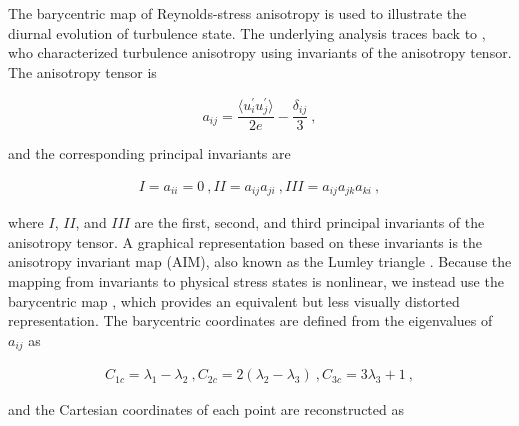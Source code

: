 \documentclass[draft]{agujournal2019}
\let\cite\shortcite
\begin{document}
\section{}
\label{sec:Anisotropy}
The barycentric map of Reynolds-stress anisotropy is used to illustrate the diurnal evolution of turbulence state. The underlying analysis traces back to , who characterized turbulence anisotropy using invariants of the anisotropy tensor. The anisotropy tensor is
\begin{linenomath*}
\begin{equation}
a_{ij}=\frac{\langle u_i^\prime u_j^\prime\rangle}{2e}-\frac{\delta_{ij}}{3}\ ,
\label{eq:Elements}
\end{equation}
\end{linenomath*}
and the corresponding principal invariants are
\begin{linenomath*}
\begin{subequations}
\begin{align}
I=a_{ii}=0 \ ,
II= a_{ij}a_{ji} \ ,
III=a_{ij}a_{jk}a_{ki} \ ,
\end{align}
\label{eq:Invariants}
\end{subequations}
\end{linenomath*}
where $I$, $II$, and $III$ are the first, second, and third principal invariants of the anisotropy tensor. A graphical representation based on these invariants is the anisotropy invariant map (AIM), also known as the Lumley triangle \cite{Lumley1977}. Because the mapping from invariants to physical stress states is nonlinear, we instead use the barycentric map \cite{Banerjee2007}, which provides an equivalent but less visually distorted representation. The barycentric coordinates are defined from the eigenvalues of $a_{ij}$ as
\begin{linenomath*}
\begin{subequations}
\begin{align}
C_{1c}=\lambda_1-\lambda_2 \ ,
C_{2c}= 2(\lambda_2-\lambda_3) \ ,
C_{3c}=3\lambda_3+1 \ ,
\end{align}
\label{eq:Barycentric}
\end{subequations}
\end{linenomath*}
and the Cartesian coordinates of each point are reconstructed as
\end{document}
